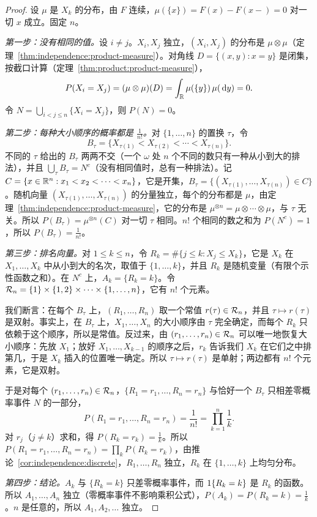 \begin{proof}
设 $\mu$ 是 $X_k$ 的分布，由 $F$ 连续，$\mu(\{x\})=F(x)-F(x-)=0$ 对一切 $x$ 成立。固定 $n$。

\emph{第一步：没有相同的值。}设 $i\neq j$。$X_i,X_j$ 独立，$(X_i,X_j)$ 的分布是 $\mu\otimes\mu$（定理~\ref{thm:independence:product-measure}）。对角线 $D=\{(x,y):x=y\}$ 是闭集，按截口计算（定理~\ref{thm:product:product-measure}），
\[
P(X_i=X_j)=(\mu\otimes\mu)(D)=\int_{\mathbb{R}}\mu(\{y\})\,\mu(\,\mathrm{d} y)=0 .
\]
令 $N=\bigcup_{i<j\leqslant n}\{X_i=X_j\}$，则 $P(N)=0$。

\emph{第二步：每种大小顺序的概率都是 $\frac1{n!}$。}对 $\{1,\dots,n\}$ 的置换 $\tau$，令
\[
B_\tau=\{X_{\tau(1)}<X_{\tau(2)}<\cdots<X_{\tau(n)}\}.
\]
不同的 $\tau$ 给出的 $B_\tau$ 两两不交（一个 $\omega$ 处 $n$ 个不同的数只有一种从小到大的排法），并且 $\bigcup_\tau B_\tau=N^c$（没有相同值时，总有一种排法）。记 $C=\{x\in\mathbb{R}^n:x_1<x_2<\cdots<x_n\}$，它是开集，$B_\tau=\{(X_{\tau(1)},\dots,X_{\tau(n)})\in C\}$。随机向量 $(X_{\tau(1)},\dots,X_{\tau(n)})$ 的分量独立，每个的分布都是 $\mu$，由定理~\ref{thm:independence:product-measure}，它的分布是 $\mu^{\otimes n}=\mu\otimes\cdots\otimes\mu$，与 $\tau$ 无关。所以 $P(B_\tau)=\mu^{\otimes n}(C)$ 对一切 $\tau$ 相同。$n!$ 个相同的数之和为 $P(N^c)=1$，所以 $P(B_\tau)=\frac1{n!}$。

\emph{第三步：排名向量。}对 $1\leqslant k\leqslant n$，令 $R_k=\#\{j\leqslant k:X_j\leqslant X_k\}$，它是 $X_k$ 在 $X_1,\dots,X_k$ 中从小到大的名次，取值于 $\{1,\dots,k\}$，并且 $R_k$ 是随机变量（有限个示性函数之和）。在 $N^c$ 上，$A_k=\{R_k=k\}$。令 $\mathcal{R}_n=\{1\}\times\{1,2\}\times\cdots\times\{1,\dots,n\}$，它有 $n!$ 个元素。

我们断言：在每个 $B_\tau$ 上，$(R_1,\dots,R_n)$ 取一个常值 $r(\tau)\in\mathcal{R}_n$，并且 $\tau\mapsto r(\tau)$ 是双射。事实上，在 $B_\tau$ 上，$X_1,\dots,X_n$ 的大小顺序由 $\tau$ 完全确定，而每个 $R_k$ 只依赖于这个顺序，所以是常值。反过来，由 $(r_1,\dots,r_n)\in\mathcal{R}_n$ 可以唯一地恢复大小顺序：先放 $X_1$；放好 $X_1,\dots,X_{k-1}$ 的顺序之后，$r_k$ 告诉我们 $X_k$ 在它们之中排第几，于是 $X_k$ 插入的位置唯一确定。所以 $\tau\mapsto r(\tau)$ 是单射；两边都有 $n!$ 个元素，它是双射。

于是对每个 $(r_1,\dots,r_n)\in\mathcal{R}_n$，$\{R_1=r_1,\dots,R_n=r_n\}$ 与恰好一个 $B_\tau$ 只相差零概率事件 $N$ 的一部分，
\[
P(R_1=r_1,\dots,R_n=r_n)=\frac1{n!}=\prod_{k=1}^n\frac1k .
\]
对 $r_j$（$j\neq k$）求和，得 $P(R_k=r_k)=\frac1k$。所以 $P(R_1=r_1,\dots,R_n=r_n)=\prod_kP(R_k=r_k)$，由推论~\ref{cor:independence:discrete}，$R_1,\dots,R_n$ 独立，$R_k$ 在 $\{1,\dots,k\}$ 上均匀分布。

\emph{第四步：结论。}$A_k$ 与 $\{R_k=k\}$ 只差零概率事件，而 $1\{R_k=k\}$ 是 $R_k$ 的函数。所以 $A_1,\dots,A_n$ 独立（零概率事件不影响乘积公式），$P(A_k)=P(R_k=k)=\frac1k$。$n$ 是任意的，所以 $A_1,A_2,\dots$ 独立。
\end{proof}

